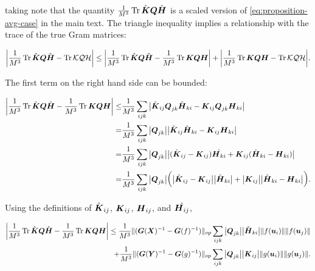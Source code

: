 taking note that the quantity $\frac{1}{M^3} \operatorname*{Tr} \hat{\boldsymbol{K}} \boldsymbol{Q} \hat{\boldsymbol{H}}$ is a scaled version of \cref{eq:proposition-avg-case} in the main text.
The triangle inequality implies a relationship with the trace of the true Gram matrices:

\begin{equation}\label{eq:triangle-ineq}
    \bigg{|}\frac{1}{M^3} \operatorname*{Tr} \hat{\boldsymbol{K}} \boldsymbol{Q} \hat{\boldsymbol{H}} - \operatorname*{Tr} \mathcal{KQH} \bigg{|} \le \bigg{|}\frac{1}{M^3} \operatorname*{Tr} \hat{\boldsymbol{K}} \boldsymbol{Q} \hat{\boldsymbol{H}} - \frac{1}{M^3} \operatorname*{Tr} \boldsymbol{K} \boldsymbol{Q} \boldsymbol{H} \bigg{|} + \bigg{|}\frac{1}{M^3} \operatorname*{Tr} \boldsymbol{K} \boldsymbol{Q} \boldsymbol{H} - \operatorname*{Tr} \mathcal{KQH} \bigg{|}.
\end{equation}

The first term on the right hand side can be bounded:

\begin{align*}
    \bigg{|}\frac{1}{M^3} \operatorname*{Tr} \hat{\boldsymbol{K}} \boldsymbol{Q} \hat{\boldsymbol{H}} - \frac{1}{M^3} \operatorname*{Tr} \boldsymbol{K} \boldsymbol{Q} \boldsymbol{H} \bigg{|}  \le & \frac{1}{M^3}\sum_{ijk} \big{|} \hat{\boldsymbol{K}}_{ij} \boldsymbol{Q}_{jk} \hat{\boldsymbol{H}}_{ki} - \boldsymbol{K}_{ij} \boldsymbol{Q}_{jk} \boldsymbol{H}_{ki}\big{|} \\   
    = & \frac{1}{M^3}\sum_{ijk} \big{|} \boldsymbol{Q}_{jk} \big{|} \big{|}  \hat{\boldsymbol{K}}_{ij} \hat{\boldsymbol{H}}_{ki} - \boldsymbol{K}_{ij} \boldsymbol{H}_{ki}\big{|} \\
    = & \frac{1}{M^3}\sum_{ijk} \big{|} \boldsymbol{Q}_{jk} \big{|} \big{|}  (\hat{\boldsymbol{K}}_{ij} - \boldsymbol{K}_{ij}) \hat{\boldsymbol{H}_{ki}} +  \boldsymbol{K}_{ij} (\hat{\boldsymbol{H}}_{ki} - \boldsymbol{H}_{ki}) \big{|} \\
    =& \frac{1}{M^3}\sum_{ijk} \big{|} \boldsymbol{Q}_{jk} \big{|} \bigg{(} \big{|}  \hat{\boldsymbol{K}}_{ij} - \boldsymbol{K}_{ij} \big{|}\big{|}\hat{\boldsymbol{H}}_{ki}\big{|} +  \big{|}\boldsymbol{K}_{ij}\big{|}\big{|} \hat{\boldsymbol{H}}_{ki} - \boldsymbol{H}_{ki} \big{|} \bigg{)}.
\end{align*}

Using the definitions of $\hat{\boldsymbol{K}}_{ij}$, $\boldsymbol{K}_{ij}$, $\boldsymbol{H}_{ij}$, and $\hat{\boldsymbol{H}_{ij}}$, 

\begin{align*}
    \bigg{|}\frac{1}{M^3} \operatorname*{Tr} \hat{\boldsymbol{K}} \boldsymbol{Q} \hat{\boldsymbol{H}} - \frac{1}{M^3} \operatorname*{Tr} \boldsymbol{K} \boldsymbol{Q} \boldsymbol{H} \bigg{|} \le \frac{1}{M^3} \|  (\boldsymbol{G}(\boldsymbol{X})^{-1} - \boldsymbol{G}(f)^{-1})\|_{op}    \sum_{ijk} \big{|} \boldsymbol{Q}_{jk} \big{|}  \big{|}\hat{\boldsymbol{H}}_{ki}\big{|} \| f(\boldsymbol{u}_i)\| \| f(\boldsymbol{u}_j) \| \\
    + \frac{1}{M^3} \|  (\boldsymbol{G}(\boldsymbol{Y})^{-1} - \boldsymbol{G}(g)^{-1})\|_{op}    \sum_{ijk} \big{|} \boldsymbol{Q}_{jk} \big{|}  \big{|}\boldsymbol{K}_{ij}\big{|} \| g(\boldsymbol{u}_i)\| \| g(\boldsymbol{u}_j) \| .
\end{align*}

